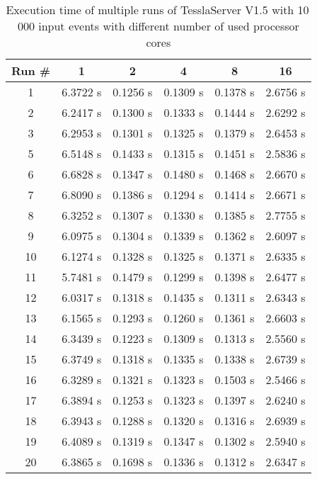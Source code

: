 \begin{table}[!htb]
  \centering
  \caption{Execution time of multiple runs of TesslaServer V1.5 with 10\,000 input events with different number of used processor cores}
  \label{table:tessla_server_v1_5_num_cores_data}
  \begin{tabular}{clllll}
    Run \# & \multicolumn{1}{c}{1} & \multicolumn{1}{c}{2} & \multicolumn{1}{c}{4} & \multicolumn{1}{c}{8} & \multicolumn{1}{c}{16} \\ \hline
    1 &  6.3722 s & 0.1256 s & 0.1309 s   & 0.1378 s & 2.6756 s \\
    2 &  6.2417 s & 0.1300 s & 0.1333 s & 0.1444 s & 2.6292 s   \\
    3 &  6.2953 s & 0.1301 s   & 0.1325 s & 0.1379 s & 2.6453 s \\
    5 &  6.5148 s   & 0.1433 s & 0.1315 s & 0.1451 s & 2.5836 s \\
    6 &  6.6828 s & 0.1347 s & 0.1480 s & 0.1468 s & 2.6670 s   \\
    7 &  6.8090 s & 0.1386 s & 0.1294 s & 0.1414 s & 2.6671 s \\
    8 &  6.3252 s & 0.1307 s  & 0.1330 s & 0.1385 s & 2.7755 s \\
    9 &  6.0975 s & 0.1304 s & 0.1339 s & 0.1362 s & 2.6097 s \\
    10 & 6.1274 s & 0.1328 s & 0.1325 s & 0.1371 s & 2.6335 s \\
    11 & 5.7481 s & 0.1479 s & 0.1299 s & 0.1398 s & 2.6477 s \\
    12 & 6.0317 s & 0.1318 s & 0.1435 s & 0.1311 s   & 2.6343 s \\
    13 & 6.1565 s & 0.1293 s & 0.1260 s   & 0.1361 s & 2.6603 s \\
    14 & 6.3439 s & 0.1223 s & 0.1309 s & 0.1313 s & 2.5560 s \\
    15 & 6.3749 s & 0.1318 s & 0.1335 s & 0.1338 s & 2.6739 s \\
    16 & 6.3289 s & 0.1321 s & 0.1323 s & 0.1503 s & 2.5466 s   \\
    17 & 6.3894 s & 0.1253 s & 0.1323 s & 0.1397 s & 2.6240 s \\
    18 & 6.3943 s & 0.1288 s & 0.1320 s & 0.1316 s & 2.6939 s \\
    19 & 6.4089 s & 0.1319 s & 0.1347 s & 0.1302 s & 2.5940 s \\
    20 & 6.3865 s & 0.1698 s & 0.1336 s & 0.1312 s & 2.6347 s
  \end{tabular}
\end{table}

